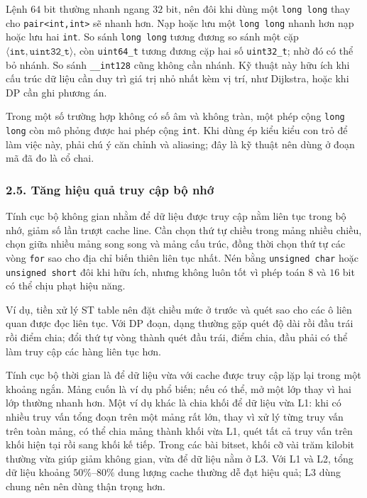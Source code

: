 \documentclass[11pt]{article}
\begin{document}
Lệnh \(64\) bit thường nhanh ngang \(32\) bit, nên đôi khi dùng một
\texttt{long long} thay cho \texttt{pair<int,int>} sẽ nhanh hơn. Nạp hoặc lưu
một \texttt{long long} nhanh hơn nạp hoặc lưu hai \texttt{int}. So sánh
\texttt{long long} tương đương so sánh một cặp \(\langle\texttt{int},
\texttt{uint32\_t}\rangle\), còn \texttt{uint64\_t} tương đương cặp hai số
\texttt{uint32\_t}; nhờ đó có thể bỏ nhánh. So sánh \texttt{\_\_int128} cũng
không cần nhánh. Kỹ thuật này hữu ích khi cấu trúc dữ liệu cần duy trì giá trị
nhỏ nhất kèm vị trí, như Dijkstra, hoặc khi DP cần ghi phương án.

Trong một số trường hợp không có số âm và không tràn, một phép cộng
\texttt{long long} còn mô phỏng được hai phép cộng \texttt{int}. Khi dùng ép
kiểu kiểu con trỏ để làm việc này, phải chú ý căn chỉnh và aliasing; đây là kỹ
thuật nên dùng ở đoạn mã đã đo là cổ chai.

\subsubsection*{2.5. Tăng hiệu quả truy cập bộ nhớ}

Tính cục bộ không gian nhằm để dữ liệu được truy cập nằm liên tục trong bộ nhớ,
giảm số lần trượt cache line. Cần chọn thứ tự chiều trong mảng nhiều chiều,
chọn giữa nhiều mảng song song và mảng cấu trúc, đồng thời chọn thứ tự các vòng
\texttt{for} sao cho địa chỉ biến thiên liên tục nhất. Nén bằng
\texttt{unsigned char} hoặc \texttt{unsigned short} đôi khi hữu ích, nhưng
không luôn tốt vì phép toán \(8\) và \(16\) bit có thể chịu phạt hiệu năng.

Ví dụ, tiền xử lý ST table nên đặt chiều mức ở trước và quét sao cho các ô liên
quan được đọc liên tục. Với DP đoạn, dạng thường gặp quét độ dài rồi đầu trái
rồi điểm chia; đổi thứ tự vòng thành quét đầu trái, điểm chia, đầu phải có thể
làm truy cập các hàng liên tục hơn.

Tính cục bộ thời gian là để dữ liệu vừa với cache được truy cập lặp lại trong
một khoảng ngắn. Mảng cuốn là ví dụ phổ biến; nếu có thể, mở một lớp thay vì
hai lớp thường nhanh hơn. Một ví dụ khác là chia khối để dữ liệu vừa L1: khi có
nhiều truy vấn tổng đoạn trên một mảng rất lớn, thay vì xử lý từng truy vấn
trên toàn mảng, có thể chia mảng thành khối vừa L1, quét tất cả truy vấn trên
khối hiện tại rồi sang khối kế tiếp. Trong các bài bitset, khối cỡ vài trăm
kilobit thường vừa giúp giảm không gian, vừa để dữ liệu nằm ở L3. Với L1 và L2,
tổng dữ liệu khoảng \(50\%\)--\(80\%\) dung lượng cache thường dễ đạt hiệu quả;
L3 dùng chung nên nên dùng thận trọng hơn.
\end{document}
